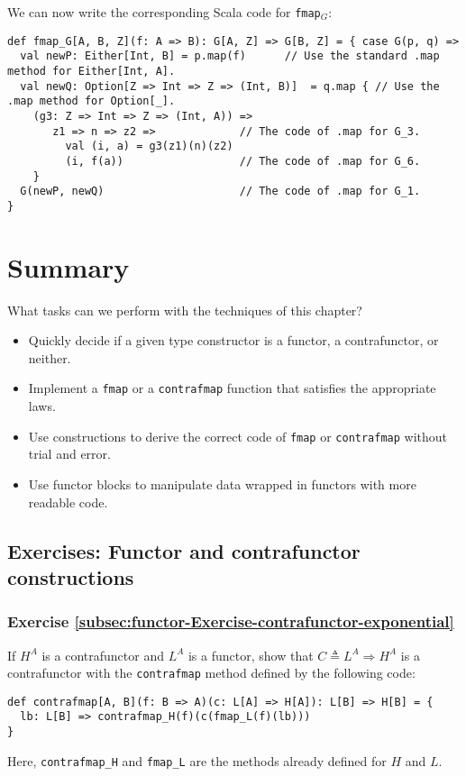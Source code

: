 We can now write the corresponding Scala code for \lstinline!fmap!$_{G}$:
\begin{lstlisting}
def fmap_G[A, B, Z](f: A => B): G[A, Z] => G[B, Z] = { case G(p, q) =>
  val newP: Either[Int, B] = p.map(f)      // Use the standard .map method for Either[Int, A].
  val newQ: Option[Z => Int => Z => (Int, B)]  = q.map { // Use the .map method for Option[_].
    (g3: Z => Int => Z => (Int, A)) => 
       z1 => n => z2 =>             // The code of .map for G_3.
         val (i, a) = g3(z1)(n)(z2)
         (i, f(a))                  // The code of .map for G_6.
    }
  G(newP, newQ)                     // The code of .map for G_1.
}
\end{lstlisting}


\section{Summary}

What tasks can we perform with the techniques of this chapter?
\begin{itemize}
\item Quickly decide if a given type constructor is a functor, a contrafunctor,
or neither.
\item Implement a \lstinline!fmap! or a \lstinline!contrafmap! function
that satisfies the appropriate laws.
\item Use constructions to derive the correct code of \lstinline!fmap!
or \lstinline!contrafmap! without trial and error.
\item Use functor blocks to manipulate data wrapped in functors with more
readable code.
\end{itemize}

\subsection{Exercises: Functor and contrafunctor constructions }

\subsubsection{Exercise \label{subsec:functor-Exercise-contrafunctor-exponential}\ref{subsec:functor-Exercise-contrafunctor-exponential}}

If $H^{A}$ is a contrafunctor and $L^{A}$ is a functor, show that
$C\triangleq L^{A}\Rightarrow H^{A}$ is a contrafunctor with the
\lstinline!contrafmap! method defined by the following code:
\begin{lstlisting}
def contrafmap[A, B](f: B => A)(c: L[A] => H[A]): L[B] => H[B] = {
  lb: L[B] => contrafmap_H(f)(c(fmap_L(f)(lb)))
}
\end{lstlisting}
Here, \lstinline!contrafmap_H! and \lstinline!fmap_L! are the methods
already defined for $H$ and $L$.

